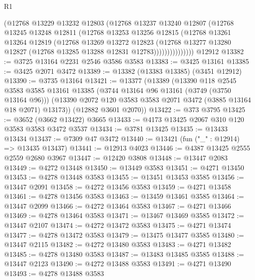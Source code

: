 \begin{lexlean}{R1}
\begin{coremodule}
                  (@12768
                    @13229
                    @13232
                    @12803
                    (@12768
                      @13237
                      @13240
                      @12807
                      (@12768
                        @13245
                        @13248
                        @12811
                        (@12768
                          @13253
                          @13256
                          @12815
                          (@12768
                            @13261
                            @13264
                            @12819
                            (@12768
                              @13269
                              @13272
                              @12823
                              (@12768
                                @13277
                                @13280
                                @12827
                                (@12768 @13285 @13288 @12831 @12783)))))))))))))))
    @12912
@13382 := @3725 @13164 @2231 @2546 @3586 @3583
@13383 := @3425 @13161
@13385 := @3425 @2071 @3472
@13389 := @13382 (@13383 @13385) (@3451 @12912)
@13390 := @3735 @13164
@13421 := @13377
    (@13389
      (@13390
        @118
        @2545
        @3583
        @3585
        @13161
        @13385
        (@3744 @13164 @96 @13161 (@3749 (@3750 @13164 @96)))
        (@13390 @2072 @120 @3583 @3583 @2071 @3472 (@3885 @13164 @18 @2071) @13173))
      (@12882 @3601 @2070))
@13422 := @373 @3795
@13425 := @3652 (@3662 @13422) @3665
@13433 := @4173 @13425 @2067 @310 @120 @3583 @3583 @3472 @3537
@13434 := @3781 @13425
@13435 := @13433 @13434
@13437 := @7309 @47 @3472
@13440 := @13421 (fun ("_" : @12914) => @13435 @13437)
@13441 := @12913 @4023
@13446 := @4387 @13425 @2555 @2559 @2680 @3967
@13447 := @12420 @3808
@13448 := @13447 @2083
@13449 := @4272 @13448
@13450 := @13449 @3583
@13451 := @4271 @13450
@13453 := @4278 @13448 @3583
@13455 := @13451 @13453 @3585
@13456 := @13447 @2091
@13458 := @4272 @13456 @3583
@13459 := @4271 @13458
@13461 := @4278 @13456 @3583
@13463 := @13459 @13461 @3585
@13464 := @13447 @2099
@13466 := @4272 @13464 @3583
@13467 := @4271 @13466
@13469 := @4278 @13464 @3583
@13471 := @13467 @13469 @3585
@13472 := @13447 @2107
@13474 := @4272 @13472 @3583
@13475 := @4271 @13474
@13477 := @4278 @13472 @3583
@13479 := @13475 @13477 @3585
@13480 := @13447 @2115
@13482 := @4272 @13480 @3583
@13483 := @4271 @13482
@13485 := @4278 @13480 @3583
@13487 := @13483 @13485 @3585
@13488 := @13447 @2123
@13490 := @4272 @13488 @3583
@13491 := @4271 @13490
@13493 := @4278 @13488 @3583

\end{coremodule}
\end{lexlean}
